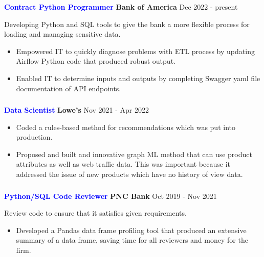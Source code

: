 \documentclass[10pt, letterpaper]{article} %
\providecommand{\tightlist}{%
  \setlength{\itemsep}{0pt}\setlength{\parskip}{0pt}}
\begin{document}
\vspace{3pt}
{\textbf {\textcolor{blue}{Contract Python Programmer}} \hfill 
\textbf{Bank of America} \hfill  
Dec 2022 - present

Developing Python and SQL tools to give the bank a more flexible process for loading and managing sensitive data. 
\begin{itemize}
\tightlist
\item Empowered IT to quickly diagnose problems with ETL process by updating Airflow Python code that produced robust output. 
\item Enabled IT to determine inputs and outputs by completing Swagger yaml file documentation of API endpoints.  
\end{itemize}

\vspace{-18pt}
\hypertarget{lowes}
{\subsubsection{} \label{lowes}}

{\textbf {\textcolor{blue}{Data Scientist}} \hfill 
\textbf{Lowe's} \hfill  
Nov 2021 - Apr 2022\\
\vspace{-10pt}
\begin{itemize}
\tightlist
\item  Coded a rules-based method for recommendations which was put into  production.
 \item  Proposed and built and innovative graph ML
  method that can use product attributes as well as web traffic data.  This was important because
  it addressed the issue of new products which have no 
    history of view data. 
\end{itemize}



\vspace{-16pt}
\hypertarget{PNC Bank}{\subsubsection{}\label{pnc}}
\textbf {\textcolor{blue}{Python/SQL Code Reviewer}} \hfill 
 \textbf{PNC Bank} \hfill 
Oct 2019 -  Nov 2021

Review code to ensure that it satisfies given requirements. 
\begin{itemize}
\tightlist
\item Developed a Pandas data frame profiling tool that produced an extensive summary of a data frame, saving time for all reviewers and money for the firm. 


\end{itemize}}}
\end{document}
